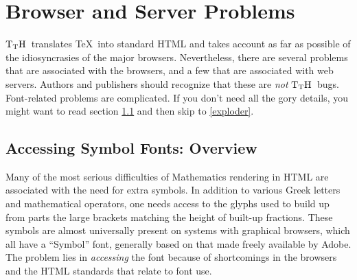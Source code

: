 \documentclass[12pt]{article}
\def\TtH{$\rm{}T_TH$}
\begin{document}
\section{Browser and Server Problems}

\TtH\ translates \TeX\ into standard HTML and takes account as far as
possible of the idiosyncrasies of the major browsers. Nevertheless,
there are several problems that are associated with the browsers, and
a few that are associated with web servers. Authors and publishers
should recognize that these are \emph{not} \TtH\ bugs. Font-related
problems are complicated. If you don't need all the gory details, you
might want to read section \ref{fontoverview} and then skip to
\ref{exploder}.

\subsection{Accessing Symbol Fonts: Overview}\label{fontoverview}

Many of the most serious difficulties of Mathematics rendering in HTML
are associated with the need for extra symbols. In addition to various
Greek letters and mathematical operators, one needs access to the
glyphs used to build up from parts the large brackets matching the
height of built-up fractions. These symbols are almost universally
present on systems with graphical browsers, which all have a
``Symbol'' font, generally based on that made freely available by
Adobe. The problem lies in \emph{accessing} the font because of
shortcomings in the browsers and the HTML standards that relate to
font use.
\end{document}
